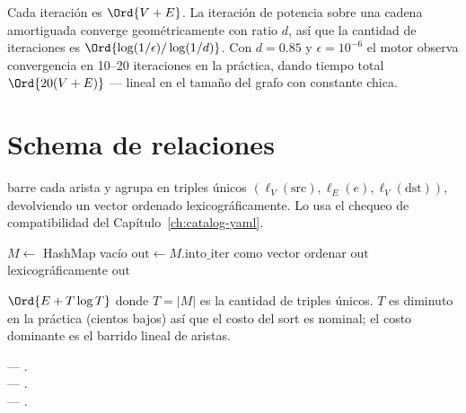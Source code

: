 \begin{complexity}
Cada iteración es $\Ord{V + E}$. La iteración de potencia sobre
una cadena amortiguada converge geométricamente con ratio $d$,
así que la cantidad de iteraciones es $\Ord{\log(1 / \epsilon) /
\log(1/d)}$. Con $d = 0.85$ y $\epsilon = 10^{-6}$ el motor
observa convergencia en 10--20 iteraciones en la práctica, dando
tiempo total $\Ord{20 (V + E)}$ --- lineal en el tamaño del grafo
con constante chica.
\end{complexity}

\section{Schema de relaciones}

 barre cada arista y agrupa en
triples únicos $(\ell_V(\text{src}), \ell_E(e), \ell_V(\text{dst}))$,
devolviendo un vector ordenado lexicográficamente. Lo usa el
chequeo de compatibilidad del
Capítulo~\ref{ch:catalog-yaml}.

\begin{algorithm}
\caption{\textsc{Get-Relation-Schema}}\label{alg:rel-schema}
$M \gets$ HashMap vacío\;
$\mathrm{out} \gets M.\text{into\_iter}$ como vector\;
ordenar $\mathrm{out}$ lexicográficamente\;
\Return $\mathrm{out}$\;
\end{algorithm}

\begin{complexity}
$\Ord{E + T \log T}$ donde $T = |M|$ es la cantidad de triples
únicos. $T$ es diminuto en la práctica (cientos bajos) así que
el costo del sort es nominal; el costo dominante es el barrido
lineal de aristas.
\end{complexity}

\begin{inthecode}
 ---
.\\
 ---
.\\
 ---
.
\end{inthecode}
